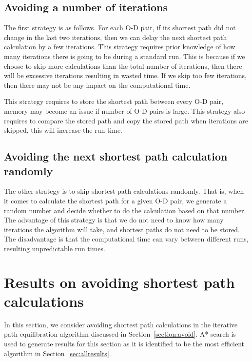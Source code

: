 \subsection{Avoiding a number of iterations}
The first strategy is as follows.
For each O-D pair,
if its shortest path did not change in the last two iterations,
then we can delay the next shortest path calculation by a few iterations.
This strategy requires prior knowledge of how many iterations there is going to be during a standard run.
This is because if we choose to skip more calculations than the total number of iterations,
then there will be excessive iterations resulting in wasted time.
If we skip too few iterations,
then there may not be any impact on the computational time.

This strategy requires to store the shortest path between every O-D pair,
memory may become an issue if number of O-D pairs is large.
This strategy also requires to compare the stored path and copy the stored path when iterations are skipped,
this will increase the run time.

\subsection{Avoiding the next shortest path calculation randomly}
The other strategy is to skip shortest path calculations randomly.
That is, when it comes to calculate the shortest path for a given O-D pair,
we generate a random number and decide whether to do the calculation based on that number.
The advantage of this strategy is that we do not need to know how many iterations the algorithm will take,
and shortest paths do not need to be stored.
The disadvantage is that the computational time can vary between different runs,
resulting unpredictable run times.

\section{Results on avoiding shortest path calculations}
In this section, we consider avoiding shortest path calculations in the iterative path equilibration algorithm discussed in Section~\ref{section:avoid}.
A* search is used to generate results for this section as it is identified to be the most efficient algorithm in Section~\ref{sec:allresults}.

